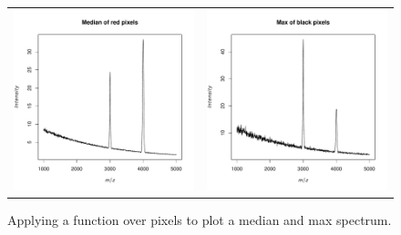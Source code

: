 \documentclass{article}
\begin{document}
\begin{figure}
\begin{center}
\begin{tabular}{cc}
\includegraphics{Cardinal-plotting-015}
&
\includegraphics{Cardinal-plotting-016}
\end{tabular}
\caption{\small Applying a function over pixels to plot a median and max spectrum.}
\end{center}
\end{figure}
\end{document}

